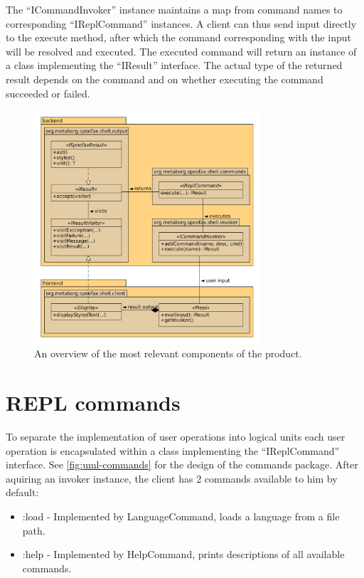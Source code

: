 The ``ICommandInvoker'' instance maintains a map from command names to
corresponding ``IReplCommand'' instances. A client can thus send input directly
to the execute method, after which the command corresponding with the input
will be resolved and executed. The executed command will return an instance of
a class implementing the ``IResult'' interface. The actual type of the returned
result depends on the command and on whether executing the command succeeded or
failed.

\begin{figure}[h!]
  \centering
  \includegraphics[width=0.75\textwidth]{uml-overview}
  \caption{An overview of the most relevant components of the product.}
  \label{fig:uml-overview}
\end{figure}

\section{REPL commands}
\label{sec:commands}

To separate the implementation of user operations into logical units each user
operation is encapsulated within a class implementing the ``IReplCommand''
interface. See \cref{fig:uml-commands} for the design of the commands package.
After aquiring an invoker instance, the client has 2 commands available to him
by default:

\begin{itemize}
  \item :load - Implemented by LanguageCommand, loads a language from a file path.
  \item :help - Implemented by HelpCommand, prints descriptions of all available commands.
\end{itemize}

